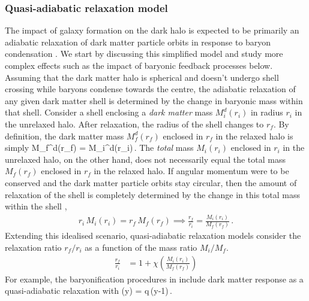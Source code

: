 \subsubsection{Quasi-adiabatic relaxation model}
\label{sec:methods-adiab-ch:simbase}
The impact of galaxy formation on the dark halo is expected to be primarily an adiabatic relaxation of dark matter particle orbits in response to baryon condensation \citep[][]{1986ApJ...301...27B}. We start by discussing this simplified model and study more complex effects such as the impact of baryonic feedback processes below.
Assuming that the dark matter halo is spherical and doesn't undergo shell crossing while baryons condense towards the centre, the adiabatic relaxation of any given dark matter shell is determined by the change in baryonic mass within that shell. 
Consider a shell enclosing a \emph{dark matter} mass $M_i^d(r_i)$ in radius $r_i$ in the unrelaxed halo. After relaxation, the radius of the shell changes to $r_f$. By definition, the dark matter mass $M_f^d(r_f)$ enclosed in $r_f$ in the relaxed halo is simply
\be 
M_f^d(r_f) = M_i^d(r_i)\,.
\label{eq:DMmass1-ch:simbase}
\ee
The \emph{total} mass $M_i(r_i)$ enclosed in $r_i$ in the unrelaxed halo, on the other hand, does not necessarily equal the total mass $M_f(r_f)$ enclosed in $r_f$ in the relaxed halo.
If angular momentum were to be conserved and the dark matter particle orbits stay circular, then the amount of relaxation of the shell is completely determined by the change in this total mass within the shell
\citep[][]{1986ApJ...301...27B},
\begin{align}
    r_i \,M_i(r_i) = r_f \,M_f(r_f) %
    \implies 
\frac{r_f}{r_i} = \frac{M_i(r_i)}{M_f(r_f)}\,. 
\label{eq:AR1-ch:simbase}
\end{align}
Extending this idealised scenario, quasi-adiabatic relaxation models consider the relaxation ratio $r_f/r_i$ as a function of the mass ratio $M_i/M_f$.
\begin{align}
\frac{r_f}{r_i} &= 1 + \chi \left( \frac{M_i(r_i)}{M_f(r_f)} \right) 
\label{eq:qAR1-ch:simbase}
\end{align}
For example, the baryonification procedures in \cite{2015JCAP...12..049S,2021MNRAS.503.4147P} include dark matter response as a quasi-adiabatic relaxation with
\be
\chi(y) = q\,(y-1)\,.
\label{eq:chi-linear-ch:simbase}
\ee

